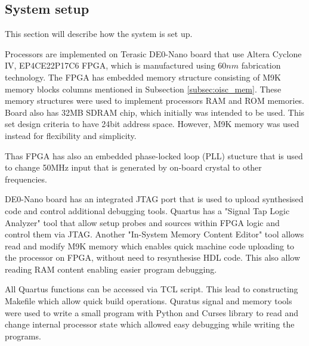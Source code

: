 \begin{colfigure}
	\label{fig:assembler}
\end{colfigure}

\subsection{System setup}\label{subsec:setup}
This section will describe how the system is set up.

Processors are implemented on Terasic DE0-Nano board that use Altera Cyclone IV, EP4CE22P17C6 FPGA, which is manufactured using $60nm$ fabrication technology.
The FPGA has embedded memory structure consisting of M9K memory blocks columns mentioned in Subsection \ref{subsec:oisc_mem}. These memory structures were used to implement processors RAM and ROM memories. Board also has 32MB SDRAM chip, which initially was intended to be used. This set design criteria to have 24bit address space. However, M9K memory was used instead for flexibility and simplicity. 

Thas FPGA has also an embedded phase-locked loop (PLL) stucture that is used to change 50MHz input that is generated by on-board crystal to other frequencies. 

DE0-Nano board has an integrated JTAG port that is used to upload synthesised code and control additional debugging tools. Quartus has a "Signal Tap Logic Analyzer" tool that allow setup probes and sources within FPGA logic and control them via JTAG. Another "In-System Memory Content Editor" tool allows read and modify M9K memory which enables quick machine code uploading to the processor on FPGA, without need to resynthesise HDL code. This also allow reading RAM content enabling easier program debugging. 

All Quartus functions can be accessed via TCL script. This lead to constructing Makefile which allow quick build operations. Quratus signal and memory tools were used to write a small program with Python and Curses library to read and change internal processor state which allowed easy debugging while writing the programs. 


